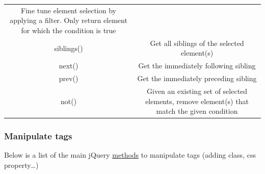 \documentclass[
]{book}
\begin{document}
\begin{longtable}[]{@{}cc@{}}
\begin{minipage}[t]{0.52\columnwidth}
Fine tune element selection by applying a filter. Only return element for which the condition is true\strut
\end{minipage}\tabularnewline
\begin{minipage}[t]{0.42\columnwidth}\centering
siblings()\strut
\end{minipage} & \begin{minipage}[t]{0.52\columnwidth}\centering
Get all siblings of the selected element(s)\strut
\end{minipage}\tabularnewline
\begin{minipage}[t]{0.42\columnwidth}\centering
next()\strut
\end{minipage} & \begin{minipage}[t]{0.52\columnwidth}\centering
Get the immediately following sibling\strut
\end{minipage}\tabularnewline
\begin{minipage}[t]{0.42\columnwidth}\centering
prev()\strut
\end{minipage} & \begin{minipage}[t]{0.52\columnwidth}\centering
Get the immediately preceding sibling\strut
\end{minipage}\tabularnewline
\begin{minipage}[t]{0.42\columnwidth}\centering
not()\strut
\end{minipage} & \begin{minipage}[t]{0.52\columnwidth}\centering
Given an existing set of selected elements, remove element(s) that match the given condition\strut
\end{minipage}\tabularnewline
\bottomrule
\end{longtable}

\hypertarget{manipulate-tags}{%
\subsubsection{Manipulate tags}\label{manipulate-tags}}

Below is a list of the main jQuery \href{https://api.jquery.com/category/manipulation/}{methods} to manipulate tags (adding class, css property\ldots)
\end{document}
